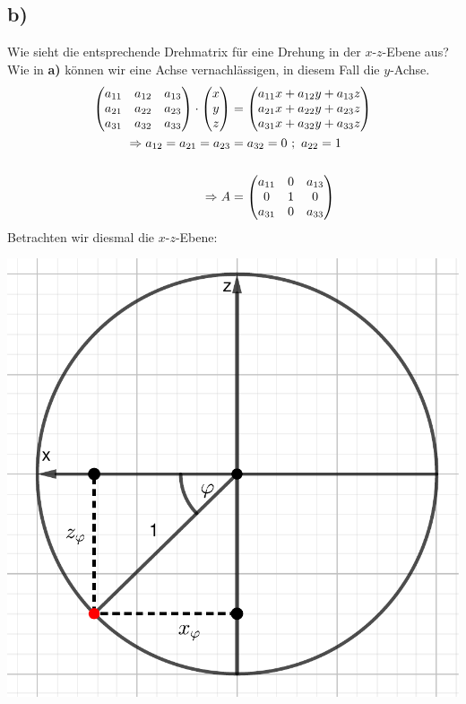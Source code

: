 \documentclass{theozettel}
\begin{document}
\subsection*{b)}Wie sieht die entsprechende Drehmatrix für eine Drehung in der $x$-$z$-Ebene aus?\\
Wie in \textbf{a)} können wir eine Achse vernachlässigen, in diesem Fall die $y$-Achse.
\begin{align*}
\mqty(a_{11} & a_{12} & a_{13}\\a_{21} &a_{22} & a_{23}\\a_{31} &a_{32} & a_{33})\cdot\mqty(x\\y\\z)&=\mqty(a_{11}x+a_{12}y+a_{13}z\\a_{21}x+a_{22}y+a_{23}z\\a_{31}x+a_{32}y+a_{33}z)\\
\Rightarrow a_{12}=a_{21}=a_{23}&=a_{32}=0\ ; \ a_{22}=1\\\\
\Rightarrow A&=\mqty(a_{11} & 0 & a_{13} \\ 0 &1 & 0\\a_{31} & 0 & a_{33})
\end{align*}
Betrachten wir diesmal die $x$-$z$-Ebene:
\begin{center}
\includegraphics[scale=0.4]{Theo07-4b)_1.pdf}
\end{center}
\end{document}
